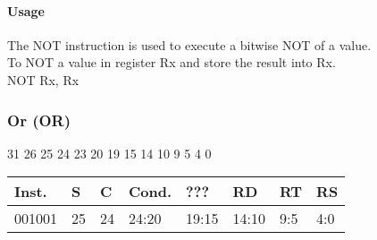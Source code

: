 \documentclass[12pt]{article}
\begin{document}
    \paragraph{Usage}
    \begin{flushleft}
    The NOT instruction is used to execute a bitwise NOT of a value.\\
    \vspace{1em}
    To NOT a value in register Rx and store the result into Rx.\\
    \vspace{1em}
    NOT Rx, Rx
    \end{flushleft}
   
   




    \newpage
    \subsubsection{Or (OR)}
    
    \hspace{1.6cm}31 \hspace{1.2cm}26 \hspace{.075cm}25 \hspace{.15cm}24 \hspace{.075cm}23 \hspace{.875cm}20 \hspace{.04cm}19 \hspace{.8cm}15 \hspace{.04cm}14 \hspace{.8cm}10 \hspace{.04cm}9 \hspace{1.15cm}5 \hspace{.04cm}4 \hspace{1.25cm}0
    \vspace{-.25cm}
    \begin{center}
        \begin{tabular}{ |p{1.8cm}|p{.3cm}|p{.3cm}|p{1.5cm}|p{1.5cm}|p{1.5cm}|p{1.5cm}|p{1.5cm}| }
            \hline
            \textbf{Inst.} & \textbf{S}& \textbf{C} & \textbf{Cond.} & ??? & \textbf{RD} & \textbf{RT} & \textbf{RS}\\
            \hline
            001001& 25 & 24 & 24:20 & 19:15 & 14:10 & 9:5 & 4:0\\
            \hline
        \end{tabular}
    \end{center}
    
\end{document}
